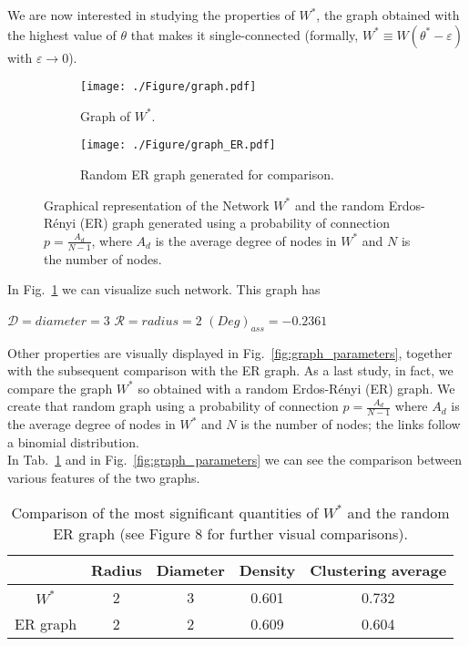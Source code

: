 \documentclass[a4paper,11pt]{article}
\begin{document}
We are now interested in studying the properties of $W^*$, the graph obtained with the highest value of $\theta$ that makes it single-connected (formally, $W^* \equiv W(\theta^* - \varepsilon)$ with $\varepsilon \rightarrow 0$). 
\\
\begin{figure}
  \centering
  \begin{subfigure}{.49\textwidth}
    \texttt{[image: ./Figure/graph.pdf]}  %
  \caption{Graph of $W^*$.}
  \label{fig:graph}
  \end{subfigure}
  \begin{subfigure}{.49\textwidth}
  \texttt{[image: ./Figure/graph\_ER.pdf]}  %
  \caption{Random ER graph generated for comparison.}
  \label{fig:graph_ER}
  \end{subfigure}
  \caption{Graphical representation of the Network $W^*$ and the random Erdos-Rényi (ER) graph generated using a probability of connection $p= \frac{A_d}{N-1}$, where $A_d$ is the average degree of nodes in $W^*$ and $N$ is the number of nodes.}
  \label{fig:networks}
\end{figure}
In Fig.~\ref{fig:graph} we can visualize such network. This graph has
\begin{center}
    $\mathcal{D} = diameter = 3$ \qquad $\mathcal{R} = radius = 2$ \qquad $(Deg)_{ass} = -0.2361$
\end{center}
Other properties are visually displayed in Fig.~\ref{fig:graph_parameters}, together with the subsequent comparison with the ER graph.
As a last study, in fact, we compare the graph $W^*$ so obtained with a random Erdos-Rényi (ER) graph. We create that random graph using a probability of connection $p= \frac{A_d}{N-1}$ where $A_d$ is the average degree of nodes in $W^*$ and $N$ is the number of nodes; the links follow a binomial distribution. 
\\
In Tab.~\ref{tab:graph_parameters} and in Fig.~\ref{fig:graph_parameters} we can see the comparison between various features of the two graphs.

\begin{table}[htp]
\centering
\begin{tabular}{c|cccc}
\toprule
 & Radius & Diameter & Density & Clustering average  \\
\midrule
$W^*$    & 2 & 3 & 0.601 & 0.732 \\
ER graph & 2 & 2 & 0.609 & 0.604 \\
\bottomrule
\bottomrule
\end{tabular}
\caption{Comparison of the most significant quantities of $W^*$ and the random ER graph (see Figure 8 for further visual comparisons).}
\label{tab:graph_parameters}
\end{table}
\end{document}
